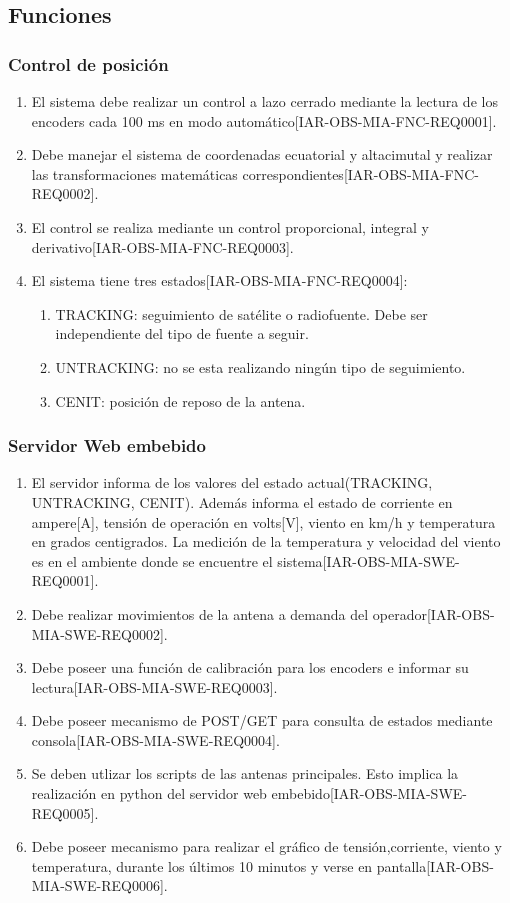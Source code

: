 \documentclass[12pt,a4paper, twosite]{article}
\begin{document}
	\subsection{Funciones}
	\label{sec:org307bb59}
	\subsubsection{Control de posición}
	\begin{enumerate}
		\item El sistema debe realizar un control a lazo cerrado mediante la lectura de los encoders cada 100 ms en modo automático[IAR-OBS-MIA-FNC-REQ0001]. 
		\item Debe  manejar el sistema de coordenadas ecuatorial y altacimutal y realizar las transformaciones matemáticas correspondientes[IAR-OBS-MIA-FNC-REQ0002]. 
		\item El control se realiza mediante un control proporcional, integral y derivativo[IAR-OBS-MIA-FNC-REQ0003]. 
		\item El sistema tiene tres estados[IAR-OBS-MIA-FNC-REQ0004]: 
			\begin{enumerate}
				\item TRACKING: seguimiento de satélite o radiofuente. Debe ser independiente del tipo de fuente a seguir.
				\item UNTRACKING: no se esta realizando ningún tipo de seguimiento. 
				\item CENIT: posición de reposo de la antena.
			\end{enumerate}

	\end{enumerate}
	\subsubsection{Servidor Web embebido}
	\begin{enumerate}
		\item El servidor informa de los valores del estado actual(TRACKING, UNTRACKING, CENIT). Además informa el estado de corriente en ampere[A], tensión de operación en volts[V], viento en km/h y temperatura en grados centigrados. La medición de la temperatura y velocidad del viento es en el ambiente donde se encuentre el sistema[IAR-OBS-MIA-SWE-REQ0001]. 
		\item Debe realizar movimientos de la antena a demanda del operador[IAR-OBS-MIA-SWE-REQ0002].
		\item Debe poseer una función de calibración para los encoders e informar su lectura[IAR-OBS-MIA-SWE-REQ0003]. 
		\item Debe poseer mecanismo de POST/GET para consulta de estados mediante consola[IAR-OBS-MIA-SWE-REQ0004]. 
		\item Se deben utlizar los scripts de las antenas principales. Esto implica la realización en python del servidor web embebido[IAR-OBS-MIA-SWE-REQ0005].
		\item Debe poseer mecanismo para realizar el gráfico de tensión,corriente, viento y temperatura, durante los últimos 10 minutos y verse en pantalla[IAR-OBS-MIA-SWE-REQ0006].
	\end{enumerate}
\end{document}
